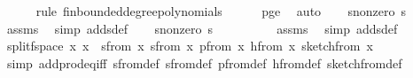 \begin{isabellebody}
\ \ \ \ \isamarkupfalse%
\ {\isacharparenleft}{\kern0pt}rule\ fin{\isacharunderscore}{\kern0pt}bounded{\isacharunderscore}{\kern0pt}degree{\isacharunderscore}{\kern0pt}polynomials{\isacharparenright}{\kern0pt}\isanewline
\ \ \ \ \isamarkupfalse%
\ p{\isacharunderscore}{\kern0pt}ge{\isacharunderscore}{\kern0pt}{}\ \isamarkupfalse%
\ auto\isanewline
\isanewline
\ \ \isamarkupfalse%
\ s{}{\isacharunderscore}{\kern0pt}nonzero{\isacharcolon}{\kern0pt}\ {\isachardoublequoteopen}s\ {\isachargreater}{\kern0pt}\ {}{\isachardoublequoteclose}\isanewline
\ \ \ \ \isamarkupfalse%
\ assms\ \isamarkupfalse%
\ {\isacharparenleft}{\kern0pt}simp\ add{\isacharcolon}{\kern0pt}sdef{\isacharparenright}{\kern0pt}\isanewline
\isanewline
\ \ \isamarkupfalse%
\ s{}{\isacharunderscore}{\kern0pt}nonzero{\isacharcolon}{\kern0pt}\ {\isachardoublequoteopen}s\ {\isachargreater}{\kern0pt}\ {}{\isachardoublequoteclose}\ \ \isanewline
\ \ \ \ \isamarkupfalse%
\ assms\ \isamarkupfalse%
\ {\isacharparenleft}{\kern0pt}simp\ add{\isacharcolon}{\kern0pt}sdef{\isacharparenright}{\kern0pt}\isanewline
\isanewline
\ \ \isamarkupfalse%
\ split{\isacharunderscore}{\kern0pt}f{}{\isacharunderscore}{\kern0pt}space{\isacharcolon}{\kern0pt}\ {\isachardoublequoteopen}{\isasymAnd}x{\isachardot}{\kern0pt}\ x\ {\isacharequal}{\kern0pt}\ {\isacharparenleft}{\kern0pt}sfrom\ x{\isacharcomma}{\kern0pt}\ sfrom\ x{\isacharcomma}{\kern0pt}\ p{\isacharunderscore}{\kern0pt}from\ x{\isacharcomma}{\kern0pt}\ h{\isacharunderscore}{\kern0pt}from\ x{\isacharcomma}{\kern0pt}\ sketch{\isacharunderscore}{\kern0pt}from\ x{\isacharparenright}{\kern0pt}{\isachardoublequoteclose}\isanewline
\ \ \ \ \isamarkupfalse%
\ {\isacharparenleft}{\kern0pt}simp\ add{\isacharcolon}{\kern0pt}prod{\isacharunderscore}{\kern0pt}eq{\isacharunderscore}{\kern0pt}iff\ sfrom{\isacharunderscore}{\kern0pt}def\ sfrom{\isacharunderscore}{\kern0pt}def\ p{\isacharunderscore}{\kern0pt}from{\isacharunderscore}{\kern0pt}def\ h{\isacharunderscore}{\kern0pt}from{\isacharunderscore}{\kern0pt}def\ sketch{\isacharunderscore}{\kern0pt}from{\isacharunderscore}{\kern0pt}def{\isacharparenright}{\kern0pt}\isanewline

\end{isabellebody}
